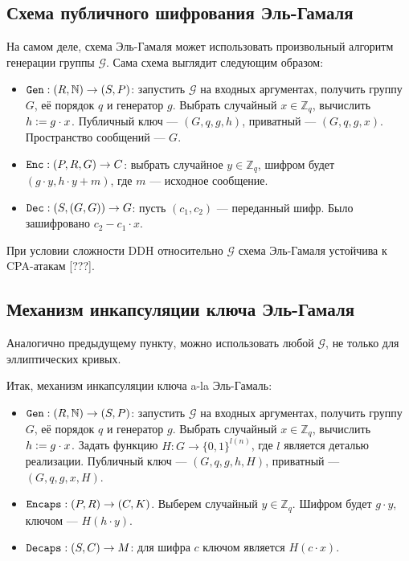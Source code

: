\documentclass[a4paper,14pt]{extarticle}
\begin{document}
\subsection{Схема публичного шифрования Эль-Гамаля}

На самом деле, схема Эль-Гамаля может использовать произвольный алгоритм
генерации группы $\mathcal{G}$. Сама схема выглядит следующим образом:

\begin{itemize}
    \item $\verb|Gen|: (R, \mathbb{N}) \to (S, P)$: запустить $\mathcal{G}$ на
        входных аргументах, получить группу $G$, её порядок $q$ и генератор $g$.
        Выбрать случайный $x \in \mathbb{Z}_q$, вычислить
        $h \vcentcolon= g \cdot x$. Публичный ключ --- $(G, q, g, h)$,
        приватный --- $(G, q, g, x)$. Пространство сообщений --- $G$.
    \item $\verb|Enc|: (P, R, G) \to C$: выбрать случайное $y \in \mathbb{Z}_q$,
        шифром будет $(g \cdot y, h \cdot y + m)$, где $m$ --- исходное
        сообщение.
    \item $\verb|Dec|: (S, (G, G)) \to G$: пусть $(c_1, c_2)$ --- переданный
        шифр. Было зашифровано $c_2 - c_1 \cdot x$.
\end{itemize}

При условии сложности DDH относительно $\mathcal{G}$ схема Эль-Гамаля устойчива
к CPA-атакам [???].

\subsection{Механизм инкапсуляции ключа Эль-Гамаля}

Аналогично предыдущему пункту, можно использовать любой $\mathcal{G}$, не только
для эллиптических кривых.

Итак, механизм инкапсуляции ключа a-la Эль-Гамаль:

\begin{itemize}
    \item $\verb|Gen|: (R, \mathbb{N}) \to (S, P)$: запустить $\mathcal{G}$ на
        входных аргументах, получить группу $G$, её порядок $q$ и генератор $g$.
        Выбрать случайный $x \in \mathbb{Z}_q$, вычислить
        $h \vcentcolon= g \cdot x$. Задать функцию $H: G \to \{0, 1\}^{l(n)}$,
        где $l$ является деталью реализации. Публичный ключ ---
        $(G, q, g, h, H)$, приватный --- $(G, q, g, x, H)$.
    \item $\verb|Encaps|: (P, R) \to (C, K)$. Выберем случайный
        $y \in \mathbb{Z}_q$. Шифром будет $g \cdot y$, ключом ---
        $H(h \cdot y)$.
    \item $\verb|Decaps|: (S, C) \to M$: для шифра $c$ ключом является
        $H(c \cdot x)$.
\end{itemize}
\end{document}

